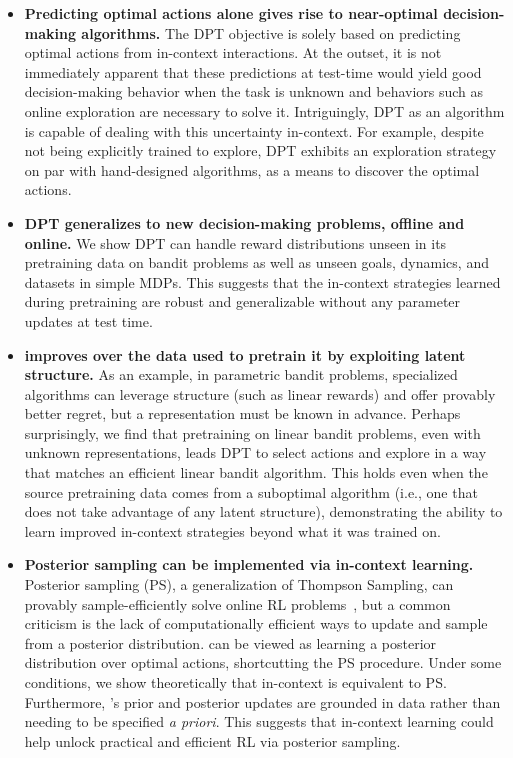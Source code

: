 \begin{itemize}[leftmargin=1em]
\item \textbf{Predicting optimal actions alone gives rise to near-optimal decision-making algorithms.}
The DPT objective is solely based on predicting optimal actions from in-context interactions. At the outset, it is not immediately apparent that these predictions at test-time would yield good decision-making behavior when the task is unknown and behaviors such as
online exploration are necessary to solve it.
Intriguingly, DPT as an algorithm is capable of dealing with this uncertainty in-context. For example, despite not being explicitly trained to explore, DPT exhibits an exploration strategy on par with hand-designed algorithms, as a means to discover the optimal actions. 


\item \textbf{DPT generalizes to new decision-making problems, offline and online.} We show DPT can handle reward distributions unseen in its pretraining data on bandit problems as well as unseen goals, dynamics, and datasets in simple MDPs. This suggests that the in-context strategies learned during pretraining are robust and generalizable without any parameter updates at test time.

\item \textbf{\macroName{} improves over the data used to pretrain it by exploiting latent structure.}
As an example, in parametric bandit problems, specialized algorithms can leverage structure (such as linear rewards) and offer provably better regret, but a representation must be known in advance. Perhaps surprisingly, we find that pretraining on linear bandit problems, even with unknown representations, leads DPT to select actions and explore in a way that matches an efficient linear bandit algorithm. This holds even when the source pretraining data comes from a suboptimal algorithm (i.e., one that does not take advantage of any latent structure), demonstrating the ability to learn improved in-context strategies beyond what it was trained on.  

\item \textbf{Posterior sampling can be implemented via in-context learning.} 
Posterior sampling (PS), a generalization of Thompson Sampling, can provably sample-efficiently solve online RL problems~\citep{osband2013more}, but a common criticism is the lack of computationally efficient ways to update and sample from a posterior distribution. \macroName{} can be viewed as learning a posterior distribution over optimal actions, shortcutting the PS procedure. Under some conditions, we show theoretically that \macroName{}  in-context is equivalent to PS. Furthermore, \macroName{}'s prior and posterior updates are grounded in data rather than needing to be specified \textit{a priori}. This suggests that in-context learning could help unlock practical and efficient RL via posterior sampling.

\end{itemize}

